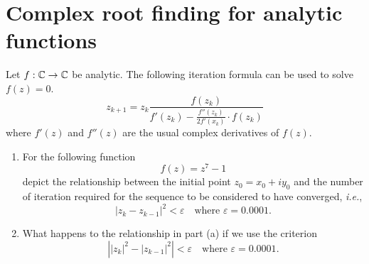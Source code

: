 \section{Complex root finding for analytic functions}
Let \(f:\mathbb{C}\to\mathbb{C}\) be analytic.
The following iteration formula can be used to solve \(f(z)=0\).
\[ z_{k+1}=z_k \frac{f(z_k)}{f'(z_k)-\frac{f''(z_k)}{2f'(x_k)}\cdot f(z_k)} \]
where \(f'(z)\) and \(f''(z)\) are the usual complex derivatives of \(f(z)\).
\begin{enumerate}
	\item For the following function
	\[ f(z)=z^7-1 \]
	depict the relationship between the initial point \(z_0=x_0+i y_0\) and the number of iteration required for the sequence to be considered to have converged, \textit{i.e.},
	\[ |z_k - z_{k-1}|^2 < \varepsilon \quad \text{where } \varepsilon=0.0001. \]
	\item What happens to the relationship in part (a) if we use the criterion 
	\[ \left| |z_k|^2 - |z_{k-1}|^2\right| < \varepsilon \quad \text{where } \varepsilon=0.0001. \]
\end{enumerate}
